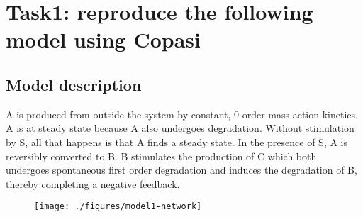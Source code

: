 \documentclass[11pt]{article}
\begin{document}
    \section{Task1: reproduce the following model using Copasi}

    \subsection{Model description}
    A is produced from outside the system by constant, 0 order mass action kinetics. A is at steady state because
    A also undergoes degradation. Without stimulation by S, all that happens is that A finds a steady state. In
    the presence of S, A is reversibly converted to B. B stimulates the production of C which both undergoes
    spontaneous first order degradation and induces the degradation of B, thereby completing a negative feedback.

    \begin{figure}
        \texttt{[image: ./figures/model1-network]}
        \label{Model1 network}
    \end{figure}


    

    \subsection{}
\end{document}
